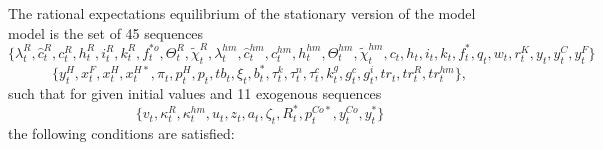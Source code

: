 \documentclass[12pt]{article}
\begin{document}
The rational expectations equilibrium of the stationary version of the model
model is the set of 45 sequences
\begin{equation*}
\{\lambda_{t}^R,\hat{c}_t^R,c_{t}^R,h_{t}^R,i_{t}^R,k_t^R, f_t^{*o},\Theta_t^R,\widetilde{\chi}_t^R, \lambda_{t}^{hm},
\hat{c}_t^{hm},c_{t}^{hm},h_{t}^{hm}, \Theta_t^{hm}, \widetilde{\chi}_t^{hm},c_{t},h_{t},i_{t},k_t,f^*_t,q_t, w_t, r_t^{K},y_{t},y_{t}^{C},y_{t}^{F}\}
\end{equation*}
\begin{equation*}
\{y_{t}^{H},x_{t}^{F},x_{t}^{H},x_{t}^{H\ast},\pi_t,p_{t}^{H},p_{t},tb_{t},\xi_t,b^*_t,\tau^k_t,\tau^n_t,\tau^c_t,k^g_t,g^c_t,g^i_t,tr_t,tr^R_t,tr^{hm}_t\},
\end{equation*} such that for given initial values and 11 exogenous sequences%
\begin{equation*}
\{v_t,\kappa^R _{t}, \kappa^{hm}_t,u_{t},z_{t},a_{t},\zeta _{t},R_{t}^{\ast },p_{t}^{Co\ast },y_{t}^{Co},y_{t}^{\ast }\}
\end{equation*}%
the following conditions are satisfied:%
\end{document}
